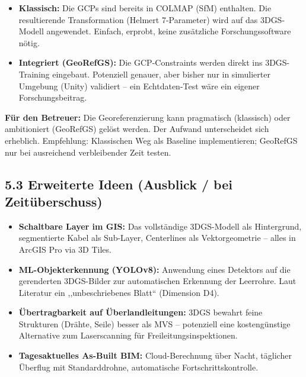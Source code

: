 \documentclass[11pt, a4paper]{article}
\begin{document}
\begin{itemize}[noitemsep]
    \item \textbf{Klassisch:} Die GCPs sind bereits in COLMAP (SfM) enthalten. Die resultierende Transformation (Helmert 7-Parameter) wird auf das 3DGS-Modell angewendet. Einfach, erprobt, keine zusätzliche Forschungssoftware nötig.
    \item \textbf{Integriert (GeoRefGS):} Die GCP-Constraints werden direkt ins 3DGS-Training eingebaut. Potenziell genauer, aber bisher nur in simulierter Umgebung (Unity) validiert -- ein Echtdaten-Test wäre ein eigener Forschungsbeitrag.
\end{itemize}

\textbf{Für den Betreuer:} Die Georeferenzierung kann pragmatisch (klassisch) oder ambitioniert (GeoRefGS) gelöst werden. Der Aufwand unterscheidet sich erheblich. Empfehlung: Klassischen Weg als Baseline implementieren; GeoRefGS nur bei ausreichend verbleibender Zeit testen.

\subsection*{5.3 Erweiterte Ideen (Ausblick / bei Zeitüberschuss)}
\begin{itemize}[noitemsep]
    \item \textbf{Schaltbare Layer im GIS:} Das vollständige 3DGS-Modell als Hintergrund, segmentierte Kabel als Sub-Layer, Centerlines als Vektorgeometrie -- alles in ArcGIS Pro via 3D Tiles.
    \item \textbf{ML-Objekterkennung (YOLOv8):} Anwendung eines Detektors auf die gerenderten 3DGS-Bilder zur automatischen Erkennung der Leerrohre. Laut Literatur ein ,,unbeschriebenes Blatt`` (Dimension D4).
    \item \textbf{Übertragbarkeit auf Überlandleitungen:} 3DGS bewahrt feine Strukturen (Drähte, Seile) besser als MVS -- potenziell eine kostengünstige Alternative zum Laserscanning für Freileitungsinspektionen.
    \item \textbf{Tagesaktuelles As-Built BIM:} Cloud-Berechnung über Nacht, täglicher Überflug mit Standarddrohne, automatische Fortschrittskontrolle.
\end{itemize}

\end{document}
